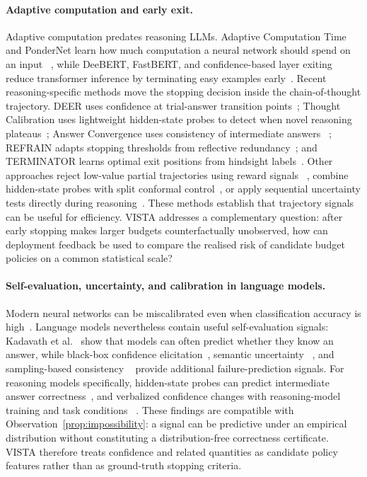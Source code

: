 \documentclass[a4paper,fleqn]{cas-sc}
\theoremstyle{plain}
\theoremstyle{definition}
\theoremstyle{remark}
\begin{document}
\paragraph{Adaptive computation and early exit.}
Adaptive computation predates reasoning LLMs. Adaptive Computation Time and
PonderNet learn how much computation a neural network should spend on an input
~\cite{graves2016adaptive,banino2021pondernet}, while DeeBERT, FastBERT, and
confidence-based layer exiting reduce transformer inference by terminating easy
examples early~\cite{xin2020deebert,liu2020fastbert,schwartz2020righttool}.
Recent reasoning-specific methods move the stopping decision inside the
chain-of-thought trajectory. DEER uses confidence at trial-answer transition
points~\cite{yang2026deer}; Thought Calibration uses lightweight hidden-state
probes to detect when novel reasoning plateaus~\cite{wu2025thoughtcalibration};
Answer Convergence uses consistency of intermediate answers
~\cite{liu2025answerconvergence}; REFRAIN adapts stopping thresholds from
reflective redundancy~\cite{sun2026refrain}; and TERMINATOR learns optimal
exit positions from hindsight labels~\cite{nagle2026terminator}.
Other approaches reject low-value partial trajectories using reward signals
~\cite{cheshmi2025earlyrejection}, combine hidden-state probes with split
conformal control~\cite{akgul2025lynx}, or apply sequential uncertainty tests
directly during reasoning~\cite{xie2026statistical}.
These methods establish that trajectory signals can be useful for efficiency.
VISTA addresses a complementary question: after early stopping makes larger
budgets counterfactually unobserved, how can deployment feedback be used to
compare the realised risk of candidate budget policies on a common statistical
scale?

\paragraph{Self-evaluation, uncertainty, and calibration in language models.}
Modern neural networks can be miscalibrated even when classification accuracy is
high~\cite{guo2017calibration}. Language models nevertheless contain useful
self-evaluation signals: Kadavath et al.~\cite{kadavath2022know} show that
models can often predict whether they know an answer, while black-box confidence
elicitation~\cite{xiong2024uncertainty}, semantic uncertainty
~\cite{kuhn2023semantic}, and sampling-based consistency
~\cite{manakul2023selfcheckgpt} provide additional failure-prediction signals.
For reasoning models specifically, hidden-state probes can predict intermediate
answer correctness~\cite{zhang2025selfverification}, and verbalized confidence
changes with reasoning-model training and task conditions
~\cite{zeng2025thinkingoutloud}. These findings are compatible with
Observation~\ref{prop:impossibility}: a signal can be predictive under an
empirical distribution without constituting a distribution-free correctness
certificate. VISTA therefore treats confidence and related quantities as
candidate policy features rather than as ground-truth stopping criteria.
\end{document}
